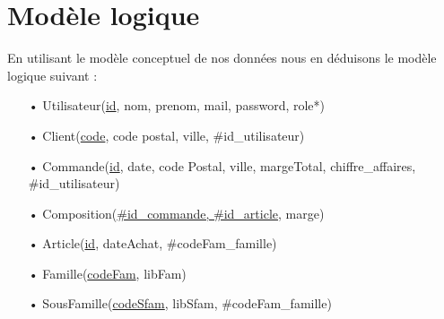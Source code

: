 \section{Modèle logique}

En utilisant le modèle conceptuel de nos données nous en déduisons le modèle logique suivant :
\begin{enumerate}
\item[•] Utilisateur(\underline{id}, nom, prenom, mail, password, role*)
\item[•] Client(\underline{code}, code postal, ville, \#id\_utilisateur)
\item[•] Commande(\underline{id}, date, code Postal, ville, margeTotal, chiffre\_affaires, \#id\_utilisateur)
\item[•] Composition(\underline{\#id\_commande, \#id\_article}, marge)
\item[•] Article(\underline{id}, dateAchat, \#codeFam\_famille)
\item[•] Famille(\underline{codeFam}, libFam)
\item[•] SousFamille(\underline{codeSfam}, libSfam, \#codeFam\_famille) \\
\end{enumerate}

